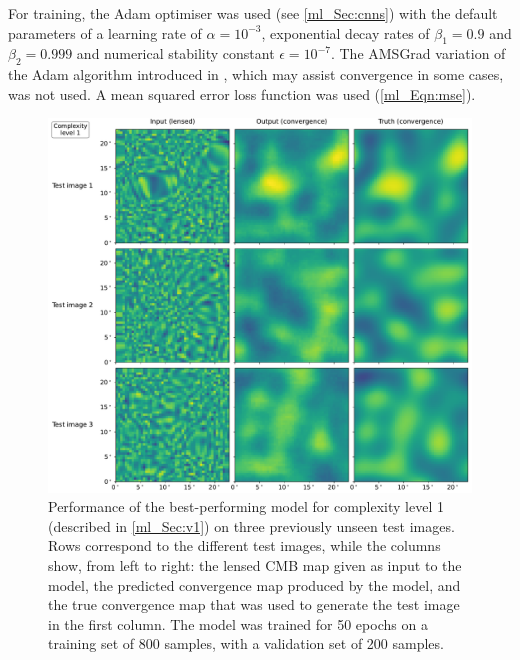 For training, the Adam optimiser was used (see \autoref{ml_Sec:cnns}) with the default parameters of a learning rate of $\alpha = 10^{-3}$, exponential decay rates of $\beta_1 = 0.9$ and $\beta_2 = 0.999$ and numerical stability constant $\epsilon = 10^{-7}$. The AMSGrad variation of the Adam algorithm introduced in \citet{Reddi2018}, which may assist convergence in some cases, was not used. A mean squared error loss function was used (\autoref{ml_Eqn:mse}).

\begin{figure}[tp]
\includegraphics[width=\textwidth]{v1_3x3}
\caption{Performance of the best-performing model for complexity level 1 (described in \autoref{ml_Sec:v1}) on three previously unseen test images. Rows correspond to the different test images, while the columns show, from left to right: the lensed CMB map given as input to the model, the predicted convergence map produced by the model, and the true convergence map that was used to generate the test image in the first column. The model was trained for 50 epochs on a training set of 800 samples, with a validation set of 200 samples.}
\label{ml_Fig:v1_3x3}
\end{figure}


